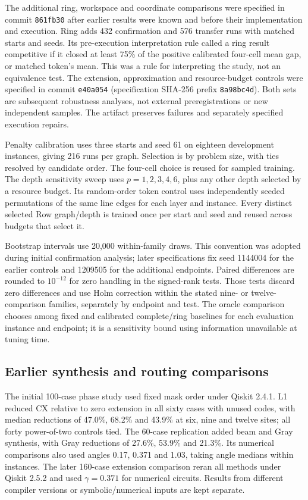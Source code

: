 \documentclass[manuscript,screen,review]{acmart}
\begin{document}
The additional ring, workspace and coordinate comparisons were specified
in commit \texttt{861fb30} after earlier results were known and before their
implementation and execution. Ring adds 432 confirmation and 576 transfer
runs with matched starts and seeds. Its pre-execution interpretation rule
called a ring result competitive if it closed at least 75\% of the positive
calibrated four-cell mean gap, or matched token's mean. This was a rule for
interpreting the study, not an equivalence test. The extension, approximation
and resource-budget controls were specified in commit \texttt{e40a054}
(specification SHA-256 prefix \texttt{8a98bc4d}). Both sets are subsequent
robustness analyses, not external preregistrations or new independent samples.
The artifact preserves failures and separately specified execution repairs.

Penalty calibration uses three starts and seed 61 on eighteen development
instances, giving 216 runs per graph. Selection is by problem size, with
ties resolved by candidate order. The four-cell choice is reused for
sampled training. The depth sensitivity sweep uses $p=1,2,3,4,6$, plus any
other depth selected by a resource budget. Its random-order token control
uses independently seeded permutations of the same line edges for each
layer and instance. Every distinct selected Row graph/depth is trained
once per start and seed and reused across budgets that select it.

Bootstrap intervals use 20,000 within-family draws. This convention was
adopted during initial confirmation analysis; later specifications fix
seed 1144004 for the earlier controls and 1209505 for the additional
endpoints. Paired differences are rounded to $10^{-12}$ for zero handling
in the signed-rank tests. Those tests discard zero differences and use
Holm correction within the stated nine- or twelve-comparison families,
separately by endpoint and test. The oracle comparison chooses among fixed
and calibrated complete/ring baselines for each evaluation instance and
endpoint; it is a sensitivity bound using information unavailable at tuning
time.

\subsection{Earlier synthesis and routing comparisons}
The initial 100-case phase study used fixed mask order under Qiskit 2.4.1.
L1 reduced CX relative to zero extension in all sixty cases with unused
codes, with median reductions of 47.0\%, 68.2\% and 43.9\% at six, nine
and twelve sites; all forty power-of-two controls tied. The 60-case
replication added beam and Gray synthesis, with Gray reductions of 27.6\%,
53.9\% and 21.3\%. Its numerical comparisons also used angles 0.17,
0.371 and 1.03, taking angle medians within instances. The later 160-case
extension comparison reran all methods under Qiskit 2.5.2 and used
$\gamma=0.371$ for numerical circuits. Results from different compiler
versions or symbolic/numerical inputs are kept separate.
\end{document}
